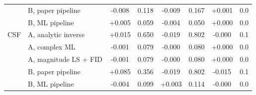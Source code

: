 \begin{table}[!htbp]
\begin{tabular}{llcccccc}
 & B, paper pipeline & -0.008 & 0.118 & -0.009 & 0.167 & +0.001 & 0.0\\
 & B, ML pipeline & +0.005 & 0.059 & -0.004 & 0.050 & +0.000 & 0.0\\
\midrule
CSF & A, analytic inverse & +0.015 & 0.650 & -0.019 & 0.802 & -0.000 & 0.1\\
 & A, complex ML & -0.001 & 0.079 & -0.000 & 0.080 & +0.000 & 0.0\\
 & A, magnitude LS + FID & -0.001 & 0.079 & -0.000 & 0.080 & +0.000 & 0.0\\
 & B, paper pipeline & +0.085 & 0.356 & -0.019 & 0.802 & -0.015 & 0.1\\
 & B, ML pipeline & -0.004 & 0.099 & +0.003 & 0.114 & -0.000 & 0.0\\
\bottomrule
\end{tabular}
\end{table}

